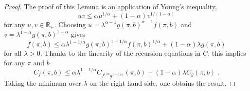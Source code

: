 \documentclass[10pt,a4paper]{amsart}
\begin{document}
\begin{proof}
The proof of this Lemma is an application of Young's inequality, 
\begin{equation}
    uv\leq\alpha u^{1/\alpha}+(1-\alpha)v^{1/(1-\alpha)}
\end{equation}
for any $u,v\in\mathbb{R}_+$. Choosing $u=\lambda^{\alpha-1}g(\pi,b)^{\alpha-1}f(\pi,b)$ and $v=\lambda^{1-\alpha}g(\pi,b)^{1-\alpha}$ gives
\begin{equation}
    f(\pi,b)\leq\alpha\lambda^{1-1/\alpha}g(\pi,b)^{1-1/\alpha}f(\pi,b)^{1/\alpha}+(1-\alpha)\lambda g(\pi,b)
\end{equation}
for all $\lambda>0$. Thanks to the linearity of the recursion equations in $C$, this implies for any $\pi$ and $b$
\begin{equation}
    C_f(\pi,b)\leq\alpha\lambda^{1-1/\alpha}C_{f^{1/\alpha}g^{1-1/\alpha}}(\pi,b)+(1-\alpha)\lambda C_g(\pi,b) \; .
\end{equation}
Taking the minimum over $\lambda$ on the right-hand side, one obtains the result.
\end{proof}
\end{document}
